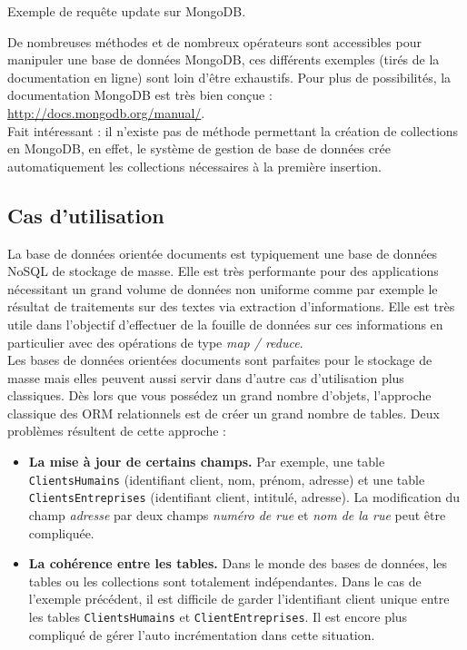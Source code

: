   \begin{listing}[H]
    \inputminted{javascript}{code/requeteMongoUpdate.js}
    \caption{Exemple de requête update sur MongoDB.}
    \label{updateMongoDB}
  \end{listing}

  De nombreuses méthodes et de nombreux opérateurs sont accessibles pour manipuler une base de données MongoDB, ces différents exemples (tirés de la documentation en ligne) sont loin d'être exhaustifs. Pour plus de possibilités, la documentation MongoDB est très bien conçue : \url{http://docs.mongodb.org/manual/}.\\

  Fait intéressant : il n'existe pas de méthode permettant la création de collections en MongoDB, en effet, le système de gestion de base de données crée automatiquement les collections nécessaires à la première insertion.

\subsection{Cas d'utilisation}

  La base de données orientée documents est typiquement une base de données NoSQL de stockage de masse. Elle est très performante pour des applications nécessitant un grand volume de données non uniforme comme par exemple le résultat de traitements sur des textes via extraction d'informations. Elle est très utile dans l'objectif d'effectuer de la fouille de données sur ces informations en particulier avec des opérations de type \textit{map / reduce}.\\

  Les bases de données orientées documents sont parfaites pour le stockage de masse mais elles peuvent aussi servir dans d'autre cas d'utilisation plus classiques. Dès lors que vous possédez un grand nombre d'objets, l'approche classique des ORM relationnels est de créer un grand nombre de tables. Deux problèmes résultent de cette approche : \\
  \begin{itemize}
    \item \textbf{La mise à jour de certains champs.} Par exemple, une table \texttt{ClientsHumains} (identifiant client, nom, prénom, adresse) et une table \texttt{ClientsEntreprises} (identifiant client, intitulé, adresse). La modification du champ \textit{adresse} par deux champs \textit{numéro de rue} et \textit{nom de la rue} peut être compliquée.
    \item \textbf{La cohérence entre les tables.} Dans le monde des bases de données, les tables ou les collections sont totalement indépendantes. Dans le cas de l'exemple précédent, il est difficile de garder l'identifiant client unique entre les tables \texttt{ClientsHumains} et \texttt{ClientEntreprises}. Il est encore plus compliqué de gérer l'auto incrémentation dans cette situation.
  \end{itemize}

